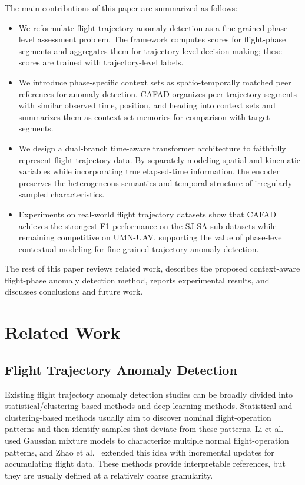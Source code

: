 \documentclass[iicol,pdflatex,sn-basic,Numbered]{sn-jnl}%
\theoremstyle{thmstyleone}%
\theoremstyle{thmstyletwo}%
\theoremstyle{thmstylethree}%
\begin{document}
The main contributions of this paper are summarized as follows:
\begin{itemize}
    \item We reformulate flight trajectory anomaly detection as a fine-grained phase-level assessment problem. 
    The framework computes scores for flight-phase segments and aggregates them for trajectory-level decision making; these scores are trained with trajectory-level labels.

    \item We introduce phase-specific context sets as spatio-temporally matched peer references for anomaly detection.
    CAFAD organizes peer trajectory segments with similar observed time, position, and heading into context sets and summarizes them as context-set memories for comparison with target segments.

    \item We design a dual-branch time-aware transformer architecture to faithfully represent flight trajectory data. 
    By separately modeling spatial and kinematic variables while incorporating true elapsed-time information, the encoder preserves the heterogeneous semantics and temporal structure of irregularly sampled characteristics.

    \item Experiments on real-world flight trajectory datasets show that CAFAD achieves the strongest F1 performance on the SJ-SA sub-datasets while remaining competitive on UMN-UAV, supporting the value of phase-level contextual modeling for fine-grained trajectory anomaly detection.
\end{itemize}

The rest of this paper reviews related work, describes the proposed context-aware flight-phase anomaly detection method, reports experimental results, and discusses conclusions and future work.

\section{Related Work}\label{sec:related_work}

\subsection{Flight Trajectory Anomaly Detection}

Existing flight trajectory anomaly detection studies can be broadly divided into statistical/clustering-based methods and deep learning methods.
Statistical and clustering-based methods usually aim to discover nominal flight-operation patterns and then identify samples that deviate from these patterns.
Li et al.~\cite{li2016gmm} used Gaussian mixture models to characterize multiple normal flight-operation patterns, and Zhao et al.~\cite{zhao2021incremental} extended this idea with incremental updates for accumulating flight data. 
These methods provide interpretable references, but they are usually defined at a relatively coarse granularity.
\end{document}

